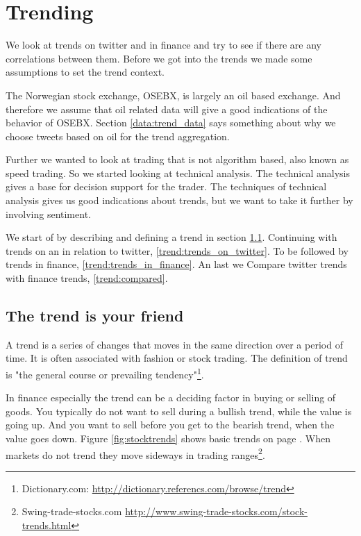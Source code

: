 \chapter{Trending}\label{trend}

We look at trends on twitter and in finance and try to see if there are any
correlations between them. Before we got into the trends we made some
assumptions to set the trend context.  

The Norwegian stock exchange, OSEBX, is largely an oil based exchange. And
therefore we assume that oil related data will give a good indications of the
behavior of OSEBX. Section \ref{data:trend_data} says something about why we
choose tweets based on oil for the trend aggregation.

Further we wanted to look at trading that is not algorithm based, also
known as speed trading. So we started looking at technical analysis. The
technical analysis gives a base for decision support for the trader. The
techniques of technical analysis gives us good indications about trends, but we
want to take it further by involving sentiment. 

We start of by describing and defining a trend in section
\ref{trend:trend_is_your_friend}. Continuing with trends on an in relation to
twitter, \ref{trend:trends_on_twitter}. To be followed by trends in finance,
\ref{trend:trends_in_finance}. An last we Compare twitter trends with finance
trends, \ref{trend:compared}.
%

\section{The trend is your friend}\label{trend:trend_is_your_friend}
A trend is a series of changes that moves in the same direction over a period
of time. It is often associated with fashion or stock trading. The
definition of trend is "the general course or prevailing
tendency"\footnote{Dictionary.com:
\url{http://dictionary.referencs.com/browse/trend}}.

In finance especially the trend can be a deciding factor in buying or selling
of goods. You typically do not want to sell during a bullish trend, while the
value is going up. And you want to sell before you get to the bearish trend,
when the value goes down. Figure \ref{fig:stocktrends} shows basic trends on
page \pageref{fig:stocktrends}. When markets do not trend they move sideways in
trading ranges\footnote{Swing-trade-stocks.com \url{http://www.swing-trade-stocks.com/stock-trends.html}}.  

